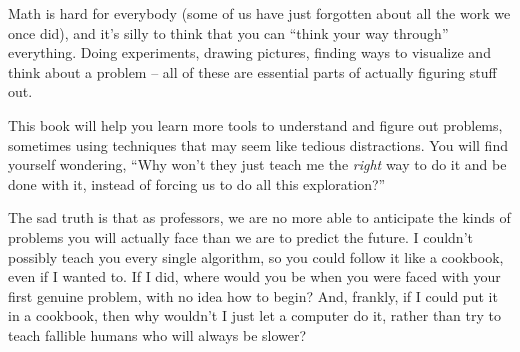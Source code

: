 \begin{itemize}
Math is hard for everybody (some of us have just forgotten
about all the work we once did), and it's silly to think that you can
``think your way through'' everything.  Doing experiments, drawing
pictures, finding ways to visualize and think about a problem -- all
of these are essential parts of actually figuring stuff out.  


This book will help you learn more tools to understand and figure out
problems, sometimes using techniques that may seem like tedious
distractions.  You will find yourself wondering, ``Why won't they just
teach me the \emph{right} way to do it and be done with it, instead of
forcing us to do all this exploration?''


The sad truth is that as professors, we are no more able to anticipate
the kinds of problems you will actually face than we are to predict
the future.  I couldn't possibly teach you every single algorithm, so
you could follow it like a cookbook, even if I wanted to.  If I did,
where would you be when you were faced with your first genuine
problem, with no idea how to begin?  And, frankly, if I could put it
in a cookbook, then why wouldn't I just let a computer do it, rather
than try to teach fallible humans who will always be slower?
\end{itemize}










